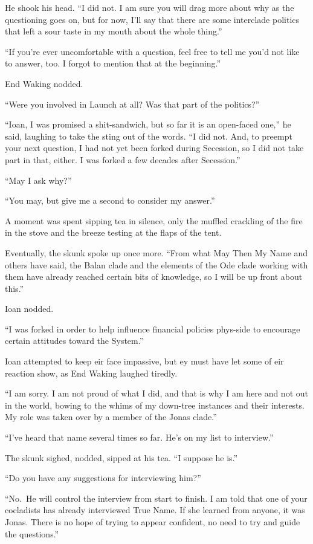 He shook his head. ``I did not. I am sure you will drag more about why as the questioning goes on, but for now, I'll say that there are some interclade politics that left a sour taste in my mouth about the whole thing.''

``If you're ever uncomfortable with a question, feel free to tell me you'd not like to answer, too. I forgot to mention that at the beginning.''

End Waking nodded.

``Were you involved in Launch at all? Was that part of the politics?''

``Ioan, I was promised a shit-sandwich, but so far it is an open-faced one,'' he said, laughing to take the sting out of the words. ``I did not. And, to preempt your next question, I had not yet been forked during Secession, so I did not take part in that, either. I was forked a few decades after Secession.''

``May I ask why?''

``You may, but give me a second to consider my answer.''

A moment was spent sipping tea in silence, only the muffled crackling of the fire in the stove and the breeze testing at the flaps of the tent.

Eventually, the skunk spoke up once more. ``From what May Then My Name and others have said, the Balan clade and the elements of the Ode clade working with them have already reached certain bits of knowledge, so I will be up front about this.''

Ioan nodded.

``I was forked in order to help influence financial policies phys-side to encourage certain attitudes toward the System.''

Ioan attempted to keep eir face impassive, but ey must have let some of eir reaction show, as End Waking laughed tiredly.

``I am sorry. I am not proud of what I did, and that is why I am here and not out in the world, bowing to the whims of my down-tree instances and their interests. My role was taken over by a member of the Jonas clade.''

``I've heard that name several times so far. He's on my list to interview.''

The skunk sighed, nodded, sipped at his tea. ``I suppose he is.''

``Do you have any suggestions for interviewing him?''

``No.~He will control the interview from start to finish. I am told that one of your cocladists has already interviewed True Name. If she learned from anyone, it was Jonas. There is no hope of trying to appear confident, no need to try and guide the questions.''


